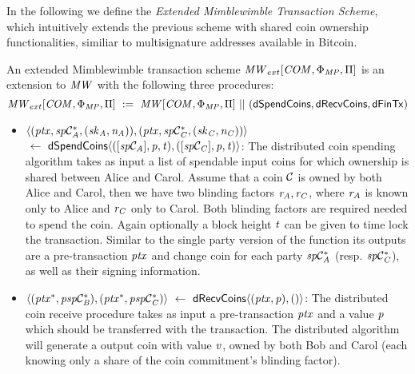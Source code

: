 In the following we define the \emph{Extended Mimblewimble Transaction Scheme}, which intuitively extends the previous scheme with shared coin ownership functionalities, similiar to multisignature addresses available in Bitcoin.

\begin{definition}
    \label{def:atom:ext-mw-tx-scheme}
    An extended Mimblewimble transaction scheme $\mathit{MW}_{ext}[\mathit{COM},\Phi_{\mathit{MP}},\Pi]$ is an extension to $\mathit{MW}$ with the following three procedures:
    \[ \mathit{MW}_{ext}[\mathit{COM},\Phi_{\mathit{MP}},\Pi] ~:=~ \mathit{MW}[\mathit{COM},\Phi_{\mathit{MP}},\Pi] ~||~ (\mathsf{dSpendCoins}, \mathsf{dRecvCoins}, \mathsf{dFinTx}) \]
    \begin{itemize}
        \item $\langle (\mathit{ptx}, \mathit{sp}\mathcal{C}_{\mathit{A}}^*, (\mathit{sk}_{\mathit{A}},\mathit{\mathit{n}_{\mathit{A}}})), (\mathit{ptx}, \mathit{sp}\mathcal{C}_{\mathit{C}}^*, (\mathit{sk}_{\mathit{C}},\mathit{\mathit{n}_{\mathit{C}}})) \rangle$ \\
        $~\leftarrow~ \mathsf{dSpendCoins} \langle ([\mathit{sp}\mathcal{C}_{\mathit{A}}],\mathit{p},\mathit{t}), ([\mathit{sp}\mathcal{C}_{\mathit{C}}],\mathit{p},\mathit{t}) \rangle$:
        The distributed coin spending algorithm takes as input a list of spendable input coins for which ownership is shared between Alice and Carol.
        Assume that a coin $\mathcal{C}$ is owned by both Alice and Carol, then we have two blinding factors $\mathit{r}_{\mathit{A}}, \mathit{r}_{\mathit{C}}$, where $\mathit{r}_{\mathit{A}}$ is known only to Alice and $\mathit{r}_{\mathit{C}}$ only to Carol.
        Both blinding factors are required needed to spend the coin.
        Again optionally a block height $\mathit{t}$ can be given to time lock the transaction.
        Similar to the single party version of the function its outputs are a pre-transaction $\mathit{ptx}$ and change coin for each party $\mathit{sp}\mathcal{C}_{\mathit{A}}^*$ (resp. $\mathit{sp}\mathcal{C}_{\mathit{C}}^*$), as well as their signing information.
        \item $\langle (\mathit{ptx}^*, \mathit{psp}\mathcal{C}_{\mathit{B}}^*), (\mathit{ptx}^*, \mathit{psp}\mathcal{C}_{\mathit{C}}^*) \rangle ~\leftarrow~ \mathsf{dRecvCoins} \langle(\mathit{ptx},\mathit{p}), () \rangle$: The distributed coin receive procedure takes as input a pre-transaction $\mathit{ptx}$ and a value $\mathit{p}$ which should be transferred with the transaction.
        The distributed algorithm will generate a output coin with value $\mathit{v}$, owned by both Bob and Carol (each knowing only a share of the coin commitment's blinding factor).

\end{itemize}
\end{definition}
